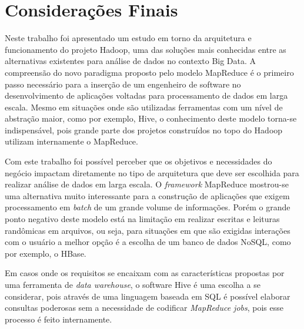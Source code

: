 \chapter{Considerações Finais}
\label{cap:conclusao}

Neste trabalho foi apresentado um estudo em torno da arquitetura e funcionamento do projeto Hadoop, uma das soluções mais conhecidas entre as alternativas existentes para análise de dados no contexto Big Data. A compreensão do novo paradigma proposto pelo modelo MapReduce é o primeiro passo necessário para a inserção de um engenheiro de software no desenvolvimento de aplicações voltadas para processamento de dados em larga escala. Mesmo em situações onde são utilizadas ferramentas com um nível de abstração maior, como por exemplo, Hive, o conhecimento deste modelo torna-se indispensável, pois grande parte dos projetos construídos no topo do Hadoop utilizam internamente o MapReduce.

Com este trabalho foi possível perceber que os objetivos e necessidades do negócio impactam diretamente no tipo de arquitetura que deve ser escolhida para realizar análise de dados em larga escala. O \textit{framework} MapReduce mostrou-se uma alternativa muito interessante para a construção de aplicações que exigem processamento em \textit{batch} de um grande volume de informações. Porém o grande ponto negativo deste modelo está na limitação em realizar escritas e leituras randômicas em arquivos, ou seja, para situações em que são exigidas interações com o usuário a melhor opção é a escolha de um banco de dados NoSQL, como por exemplo, o HBase.

Em casos onde os requisitos se encaixam com as características propostas por uma ferramenta de \textit{data warehouse}, o software Hive é uma escolha a se considerar, pois através de uma linguagem baseada em SQL é possível elaborar consultas poderosas sem a necessidade de codificar \textit{MapReduce jobs}, pois esse processo é feito internamente.
